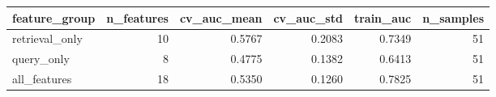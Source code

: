 \begin{tabular}{lrrrrr}
\toprule
feature_group & n_features & cv_auc_mean & cv_auc_std & train_auc & n_samples \\
\midrule
retrieval_only & 10 & 0.5767 & 0.2083 & 0.7349 & 51 \\
query_only & 8 & 0.4775 & 0.1382 & 0.6413 & 51 \\
all_features & 18 & 0.5350 & 0.1260 & 0.7825 & 51 \\
\bottomrule
\end{tabular}
